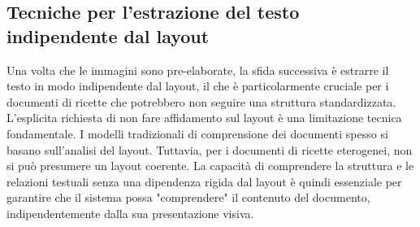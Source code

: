 \documentclass[a4paper, 11pt]{article}
\begin{document}
\subsection{Tecniche per l'estrazione del testo indipendente dal layout}

Una volta che le immagini sono pre-elaborate, la sfida successiva è estrarre il testo in modo indipendente dal layout, il che è particolarmente cruciale per i documenti di ricette che potrebbero non seguire una struttura standardizzata. L'esplicita richiesta di non fare affidamento sul layout è una limitazione tecnica fondamentale. I modelli tradizionali di comprensione dei documenti spesso si basano sull'analisi del layout. \cite{survey_deep_learning_ocr} Tuttavia, per i documenti di ricette eterogenei, non si può presumere un layout coerente. La capacità di comprendere la struttura e le relazioni testuali senza una dipendenza rigida dal layout è quindi essenziale per garantire che il sistema possa "comprendere" il contenuto del documento, indipendentemente dalla sua presentazione visiva.
\end{document}
